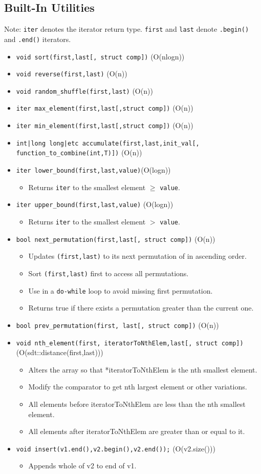 \documentclass{article}
\newcommand{\citem}[1]{\item \texttt{#1}}
\begin{document}
\subsection{Built-In Utilities}
Note: \texttt{iter} denotes the iterator return type. \texttt{first} and \texttt{last} denote \texttt{.begin()} and \texttt{.end()} iterators.
\begin{itemize}
    \citem{void sort(first,last[, struct comp])} (O(nlogn))
    \citem{void reverse(first,last)} (O(n))
    \citem{void random\_shuffle(first,last)} (O(n))
    \citem{iter max\_element(first,last[,struct comp])} (O(n))
    \citem{iter min\_element(first,last[,struct comp])} (O(n))
    \citem{int|long long|etc accumulate(first,last,init\_val[, function\_to\_combine(int,T)])} (O(n))
    \citem{iter lower\_bound(first,last,value)}(O(logn))
    \begin{itemize}
        \item Returns \texttt{iter} to the smallest element $\geq$ \texttt{value}.
    \end{itemize}
    \citem{iter upper\_bound(first,last,value)} (O(logn))
    \begin{itemize}
        \item Returns \texttt{iter} to the smallest element $>$ \texttt{value}.
    \end{itemize}
    \citem{bool next\_permutation(first,last[, struct comp])} (O(n))
    \begin{itemize}
        \item Updates \texttt{(first,last)} to its next permutation of in ascending order.
        \item Sort \texttt{(first,last)} first to access all permutations.
        \item Use in a \texttt{do-while} loop to avoid missing first permutation.
        \item Returns true if there exists a permutation greater than the current one.
    \end{itemize}
    \citem{bool prev\_permutation(first, last[, struct comp])} (O(n))
    \citem{void nth\_element(first, iteratorToNthElem,last[, struct comp])} (O(sdt::distance(first,last)))
    \begin{itemize}
        \item Alters the array so that *iteratorToNthElem is the nth smallest element.
        \item Modify the comparator to get nth largest element or other variations.
        \item All elements before iteratorToNthElem are less than the nth smallest element.
        \item All elements after iteratorToNthElem are greater than or equal to it.
    \end{itemize}
    \citem{void insert(v1.end(),v2.begin(),v2.end());} (O(v2.size()))
    \begin{itemize}
        \item Appends whole of v2 to end of v1.
    \end{itemize}
\end{itemize}
\end{document}
